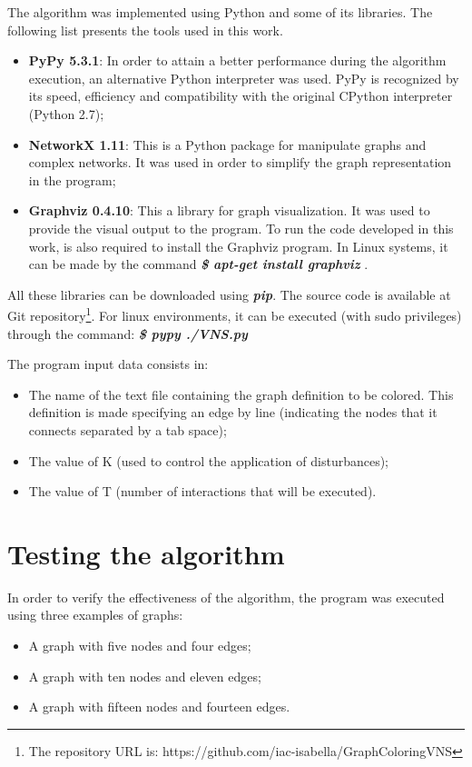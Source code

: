 \documentclass[11pt]{article}
\begin{document}
The algorithm was implemented using Python and some of its libraries. The following list presents the tools used in this work.
\begin{itemize}
    \item \textbf{PyPy 5.3.1}: In order to attain a better performance during the algorithm execution, an alternative Python interpreter was used. PyPy is recognized by its speed, efficiency and compatibility with the original CPython interpreter (Python 2.7); 
    \item \textbf{NetworkX 1.11}: This is a Python package for manipulate graphs and complex networks. It was used in order to simplify the graph representation in the program;
    \item \textbf{Graphviz 0.4.10}: This a library for graph visualization. It was used to provide the visual output to the program. To run the code developed in this work, is also required to install the Graphviz program. In Linux systems, it can be made by the command \textbf{\textit{\$ apt-get install graphviz}} .
\end{itemize}

All these libraries can be downloaded using \textbf{\textit{pip}}. The source code is available at Git repository\footnote{The repository URL is: https://github.com/iac-isabella/GraphColoringVNS}. For linux environments, it can be executed (with sudo privileges) through the command: \textbf{\textit{\$ pypy ./VNS.py}}

The program input data consists in:
\begin{itemize}
    \item The name of the text file containing the graph definition to be colored. This definition is made specifying an edge by line (indicating the nodes that it connects separated by a tab space);
    \item The value of K (used to control the application of disturbances);
    \item The value of T (number of interactions that will be  executed).
\end{itemize}

\section{Testing the algorithm}
\label{test}
In order to verify the effectiveness of the algorithm, the program was executed using three examples of graphs:
\begin{itemize}
    \item A graph with five nodes and four edges;
    \item A graph with ten nodes and eleven edges;
    \item A graph with fifteen nodes and  fourteen edges.
\end{itemize}
\end{document}
